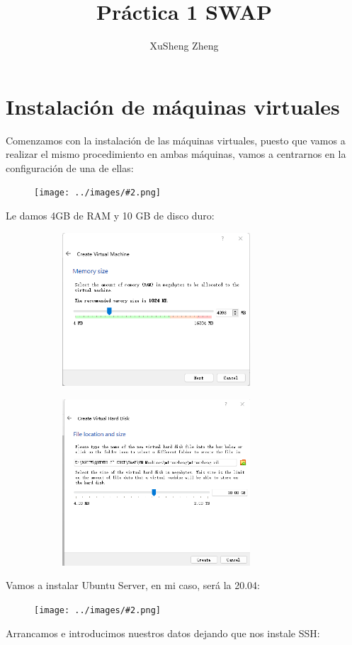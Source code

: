 \documentclass[twoside]{article}
\title{Práctica 1 SWAP}
\author{XuSheng Zheng}
\date{}
\newcommand{\image}[2]{
\begin{figure}[H]
    \texttt{[image: ../images/\#2.png]}
    \centering
\end{figure}
}
\begin{document}
\maketitle
\tableofcontents
\newpage

\section{Instalación de máquinas virtuales}
Comenzamos con la instalación de las máquinas virtuales, puesto que vamos a realizar el mismo procedimiento en ambas máquinas, vamos a centrarnos en la configuración de una de ellas:
\image{8}{1}
Le damos 4GB de RAM y 10 GB de disco duro:
\begin{figure}[H]
    \centering
    \begin{subfigure}{.5\textwidth}
        \centering
        \includegraphics[width=7cm]{../images/2.png}
    \end{subfigure}%
    \begin{subfigure}{.5\textwidth}
        \centering
        \includegraphics[width=7cm]{../images/3.png}
    \end{subfigure}
\end{figure}
Vamos a instalar Ubuntu Server, en mi caso, será la 20.04:
\image{8}{4}
Arrancamos e introducimos nuestros datos dejando que nos instale SSH:
\end{document}
